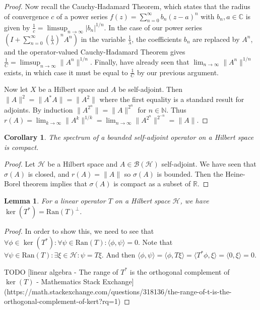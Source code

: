 \documentclass[12pt,oneside]{report}
\newtheorem{cor}[thm]{Corollary}
\newtheorem{lem}[thm]{Lemma}
\begin{document}
\begin{proof}
    Now recall the Cauchy-Hadamard Theorem, which states that the radius of convergence $c$ of a power series $f(z)= \sum_{n=0}^{\infty} b_{n}(z-a)^{n}$ with $b_{n}, a \in \mathbb{C}$ is given by $\frac{1}{c} = \limsup_{n \to \infty} |b_{n}|^{1/n}$. In the case of our power series $\left( I + \sum_{n=0}^{\infty} \left( \frac{1}{\lambda} \right)^{n}A^{n} \right)$ in the variable $\frac{1}{\lambda}$, the coefficients $b_{n}$ are replaced by $A^{n}$, and the operator-valued Cauchy-Hadamard Theorem gives $\frac{1}{C} = \limsup_{n \to \infty} \|A^{n}\|^{1/n}$. Finally, have already seen that $\lim_{ n \to \infty }\|A^{n}\|^{1/n}$ exists, in which case it must be equal to $\frac{1}{C}$ by our previous argument.

    Now let $X$ be a Hilbert space and $A$ be self-adjoint. Then $\|A\|^{2} = \|A^{*}A\| = \|A^{2}\|$ where the first equality is a standard result for adjoints. By induction $\|A^{2^{n}}\| = \|A\|^{2^{n}}$ for $n \in \mathbb{N}$. Thus $r(A) = \lim_{ k \to \infty } \|A^{k}\|^{1/k} = \lim_{ n \to \infty } \|A^{2^{n}}\|^{2^{-n}} = \|A\|$.
\end{proof}

\begin{cor}
    The spectrum of a bounded self-adjoint operator on a Hilbert space is compact.
\end{cor}
\begin{proof}
    Let $\mathscr{H}$ be a Hilbert space and $A \in \mathscr{B}(\mathscr{H})$ self-adjoint. We have seen that $\sigma(A)$ is closed, and $r(A) = \|A\|$ so $\sigma(A)$ is bounded. Then the Heine-Borel theorem implies that $\sigma(A)$ is compact as a subset of $\mathbb{R}$.
\end{proof}

\begin{lem}\label{adjoint-ker-orth-to-operator-range}
    For a linear operator $T$ on a Hilbert space $\mathscr{H}$, we have $\ker(T^{*}) = \text{Ran}(T)^{\perp}$.
\end{lem}
\begin{proof}
    In order to show this, we need to see that $\forall \phi \in \ker(T^{*}): \forall \psi \in \text{Ran}(T): \langle \phi, \psi \rangle = 0$. Note that $\forall \psi \in \text{Ran}(T): \exists \xi \in \mathscr{H}: \psi = T\xi$. And then $\langle \phi, \psi \rangle = \langle \phi, T\xi \rangle = \langle T^{*}\phi, \xi \rangle = \langle 0, \xi \rangle = 0$.
    
    TODO [linear algebra - The range of $T^*$ is the orthogonal complement of $\ker(T)$ - Mathematics Stack Exchange](https://math.stackexchange.com/questions/318136/the-range-of-t-is-the-orthogonal-complement-of-kert?rq=1)
\end{proof}
\end{document}

